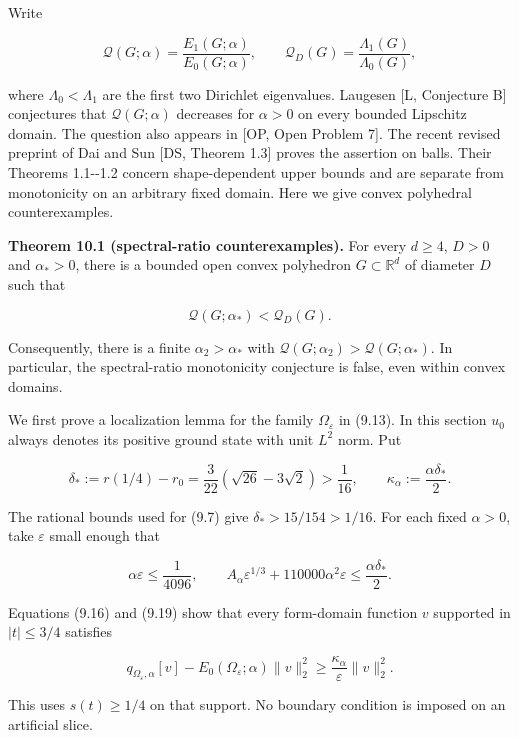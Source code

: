 \documentclass[11pt]{article}
\begin{document}
Write

\[
\mathcal Q(G;\alpha)=\frac{E_1(G;\alpha)}{E_0(G;\alpha)},
\qquad
\mathcal Q_D(G)=\frac{\Lambda_1(G)}{\Lambda_0(G)},
\tag{10.1}
\]

where \(\Lambda_0<\Lambda_1\) are the first two Dirichlet eigenvalues.
Laugesen {[}L, Conjecture B{]} conjectures that \(\mathcal Q(G;\alpha)\)
decreases for \(\alpha>0\) on every bounded Lipschitz domain. The
question also appears in {[}OP, Open Problem 7{]}. The recent revised
preprint of Dai and Sun {[}DS, Theorem 1.3{]} proves the assertion on
balls. Their Theorems 1.1-\/-1.2 concern shape-dependent upper bounds
and are separate from monotonicity on an arbitrary fixed domain. Here we
give convex polyhedral counterexamples.

\textbf{Theorem 10.1 (spectral-ratio counterexamples).} For every
\(d\ge4\), \(D>0\) and \(\alpha_*>0\), there is a bounded open convex
polyhedron \(G\subset\mathbb R^d\) of diameter \(D\) such that

\[
\mathcal Q(G;\alpha_*)<\mathcal Q_D(G).
\tag{10.2}
\]

Consequently, there is a finite \(\alpha_2>\alpha_*\) with
\(\mathcal Q(G;\alpha_2)>\mathcal Q(G;\alpha_*)\). In particular, the
spectral-ratio monotonicity conjecture is false, even within convex
domains.

We first prove a localization lemma for the family
\(\Omega_\varepsilon\) in (9.13). In this section \(u_0\) always denotes
its positive ground state with unit \(L^2\) norm. Put

\[
\delta_*:=r(1/4)-r_0
=\frac3{22}(\sqrt{26}-3\sqrt2)>\frac1{16},
\qquad \kappa_\alpha:=\frac{\alpha\delta_*}{2}.
\tag{10.3}
\]

The rational bounds used for (9.7) give \(\delta_*>15/154>1/16\). For
each fixed \(\alpha>0\), take \(\varepsilon\) small enough that

\[
\alpha\varepsilon\le\frac1{4096},\qquad
A_\alpha\varepsilon^{1/3}+110000\alpha^2\varepsilon
\le\frac{\alpha\delta_*}{2}.
\tag{10.4}
\]

Equations (9.16) and (9.19) show that every form-domain function \(v\)
supported in \(|t|\le3/4\) satisfies

\[
q_{\Omega_\varepsilon,\alpha}[v]
-E_0(\Omega_\varepsilon;\alpha)\|v\|_2^2
\ge\frac{\kappa_\alpha}{\varepsilon}\|v\|_2^2.
\tag{10.5}
\]

This uses \(s(t)\ge1/4\) on that support. No boundary condition is
imposed on an artificial slice.
\end{document}
